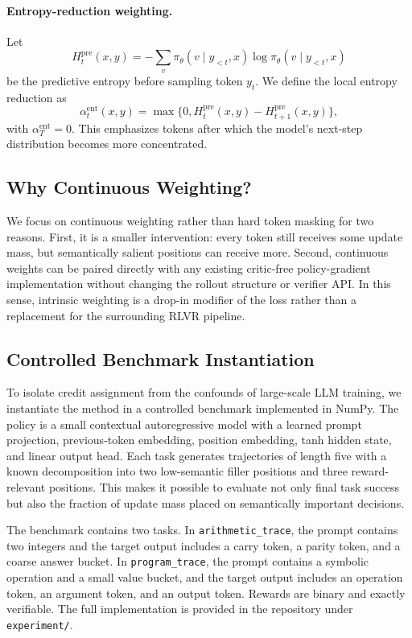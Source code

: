\paragraph{Entropy-reduction weighting.}
Let
\begin{equation}
 H_t^{\mathrm{pre}}(x,y) = -\sum_v \pi_\theta(v \mid y_{<t}, x) \log \pi_\theta(v \mid y_{<t}, x)
\end{equation}
be the predictive entropy before sampling token $y_t$. We define the local entropy reduction as
\begin{equation}
 \alpha_t^{\mathrm{ent}}(x,y) = \max\{0, H_t^{\mathrm{pre}}(x,y) - H_{t+1}^{\mathrm{pre}}(x,y)\},
\end{equation}
with $\alpha_T^{\mathrm{ent}} = 0$. This emphasizes tokens after which the model's next-step distribution becomes more concentrated.

\subsection{Why Continuous Weighting?}

We focus on continuous weighting rather than hard token masking for two reasons. First, it is a smaller intervention: every token still receives some update mass, but semantically salient positions can receive more. Second, continuous weights can be paired directly with any existing critic-free policy-gradient implementation without changing the rollout structure or verifier API. In this sense, intrinsic weighting is a drop-in modifier of the loss rather than a replacement for the surrounding RLVR pipeline.

\subsection{Controlled Benchmark Instantiation}

To isolate credit assignment from the confounds of large-scale LLM training, we instantiate the method in a controlled benchmark implemented in NumPy. The policy is a small contextual autoregressive model with a learned prompt projection, previous-token embedding, position embedding, tanh hidden state, and linear output head. Each task generates trajectories of length five with a known decomposition into two low-semantic filler positions and three reward-relevant positions. This makes it possible to evaluate not only final task success but also the fraction of update mass placed on semantically important decisions.

The benchmark contains two tasks. In \texttt{arithmetic\_trace}, the prompt contains two integers and the target output includes a carry token, a parity token, and a coarse answer bucket. In \texttt{program\_trace}, the prompt contains a symbolic operation and a small value bucket, and the target output includes an operation token, an argument token, and an output token. Rewards are binary and exactly verifiable. The full implementation is provided in the repository under \texttt{experiment/}.
